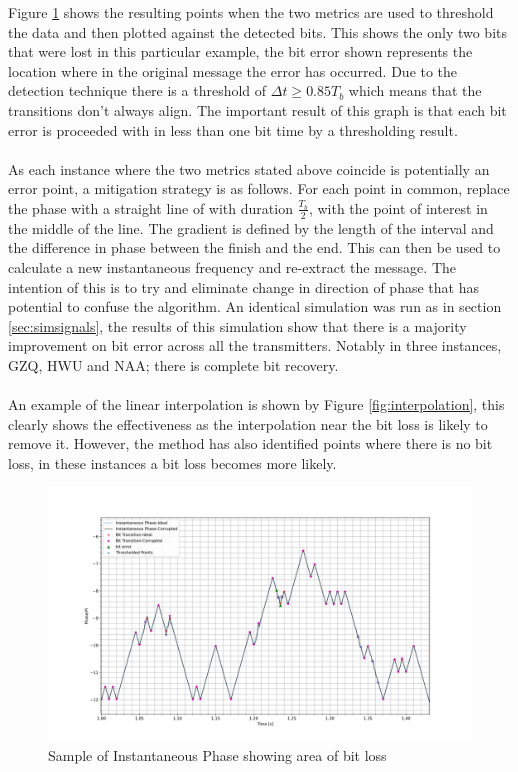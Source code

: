 Figure \ref{fig:thresholding} shows the resulting points when the two metrics are used to threshold the data and then plotted against the detected bits. This shows the only two bits that were lost in this particular example, the bit error shown represents the location where in the original message the error has occurred. Due to the detection technique there is a threshold of $\Delta t \geq 0.85T_b$ which means that the transitions don't always align. The important result of this graph is that each bit error is proceeded with in less than one bit time by a thresholding result.
\\\\
As each instance where the two metrics stated above coincide is potentially an error point, a mitigation strategy is as follows. For each point in common, replace the phase with a straight line of with duration $\frac{T_b}{2}$, with the point of interest in the middle of the line. The gradient is defined by the length of the interval and the difference in phase between the finish and the end. This can then be used to calculate a new instantaneous frequency and re-extract the message. The intention of this is to try and eliminate change in direction of phase that has potential to confuse the algorithm. An identical simulation was run as in section \ref{sec:simsignals}, the results of this simulation show that there is a majority improvement on bit error across all the transmitters. Notably in three instances, GZQ, HWU and NAA; there is complete bit recovery. 
\\\\
An example of the linear interpolation is shown by Figure \ref{fig:interpolation}, this clearly shows the effectiveness as the interpolation near the bit loss is likely to remove it. However, the method has also identified points where there is no bit loss, in these instances a bit loss becomes more likely.
\begin{figure}[h!]
    \centering
    \includegraphics[width = \textwidth]{figs/error/Thresholding.png}
    \caption{Sample of Instantaneous Phase showing area of bit loss}
    \label{fig:thresholding}
\end{figure}

